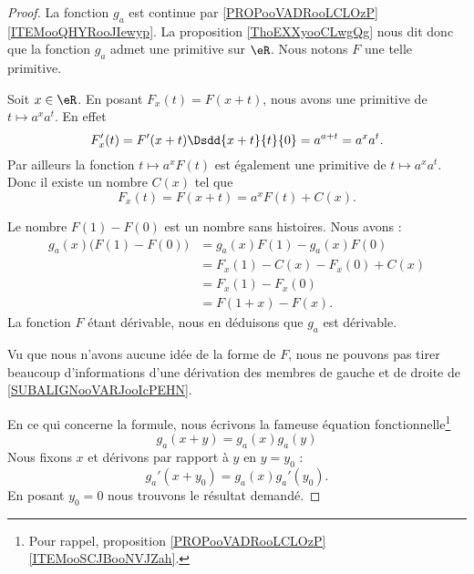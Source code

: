 \begin{proof}
    La fonction \( g_a\) est continue par \ref{PROPooVADRooLCLOzP}\ref{ITEMooQHYRooJIewyp}. La proposition \ref{ThoEXXyooCLwgQg} nous dit donc que la fonction \( g_a\) admet une primitive sur \( \eR\). Nous notons \( F\) une telle primitive.

    Soit \( x\in \eR\). En posant \( F_x(t)=F(x+t)\), nous avons une primitive de \( t\mapsto a^xa^t\). En effet
    \begin{equation}
        F_x'(t)=F'(x+t)\Dsdd{ x+t }{t}{0}=a^{a+t}=a^xa^t.
    \end{equation}
    Par ailleurs la fonction \( t\mapsto a^xF(t)\) est également une primitive de \( t\mapsto a^xa^t\). Donc il existe un nombre \( C(x)\) tel que
    \begin{equation}
        F_x(t)=F(x+t)=a^xF(t)+C(x).
    \end{equation}
    
    Le nombre \( F(1)-F(0)\) est un nombre sans histoires. Nous avons :
    \begin{subequations}        \label{SUBALIGNooVARJooIcPEHN}
        \begin{align}
            g_a(x)\big( F(1)-F(0) \big)&=g_a(x)F(1)-g_a(x)F(0)\\
            &=F_x(1)-C(x)-F_x(0)+C(x)\\
            &=F_x(1)-F_x(0)\\
            &=F(1+x)-F(x).
        \end{align}
    \end{subequations}
    La fonction \( F\) étant dérivable, nous en déduisons que \( g_a\) est dérivable.

    Vu que nous n'avons aucune idée de la forme de \( F\), nous ne pouvons pas tirer beaucoup d'informations d'une dérivation des membres de gauche et de droite de \eqref{SUBALIGNooVARJooIcPEHN}.

    En ce qui concerne la formule, nous écrivons la fameuse équation fonctionnelle\footnote{Pour rappel, proposition \ref{PROPooVADRooLCLOzP}\ref{ITEMooSCJBooNVJZah}.}
    \begin{equation}
        g_a(x+y)=g_a(x)g_a(y)
    \end{equation}
    Nous fixons \( x\) et dérivons par rapport à \( y\) en \( y=y_0\) :
    \begin{equation}
        g_a'(x+y_0)=g_a(x)g_a'(y_0).
    \end{equation}
    En posant \( y_0=0\) nous trouvons le résultat demandé.
\end{proof}

